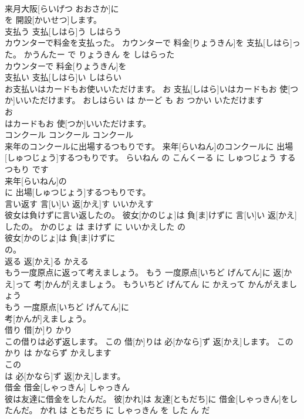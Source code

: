 \documentclass[8pt]{extreport}
\begin{document}
\begin{CJK}{UTF8}{min}
\\	来月大阪[らいげつ おおさか]に
\\	を 開設[かいせつ]します。			
\\	支払う	支払[しはら]う	しはらう	
\\	カウンターで料金を支払った。	カウンターで 料金[りょうきん]を 支払[しはら]った。	かうんたー で りょうきん を しはらった	
\\	カウンターで 料金[りょうきん]を
\\	支払い	支払[しはら]い	しはらい	
\\	お支払いはカードもお使いいただけます。	お 支払[しはら]いはカードもお 使[つか]いいただけます。	おしはらい は かーど も お つかい いただけます	
\\	お
\\	はカードもお 使[つか]いいただけます。			
\\	コンクール	コンクール	コンクール	
\\	来年のコンクールに出場するつもりです。	来年[らいねん]のコンクールに 出場[しゅつじょう]するつもりです。	らいねん の こんくーる に しゅつじょう する つもり です	
\\	来年[らいねん]の
\\	に 出場[しゅつじょう]するつもりです。			
\\	言い返す	言[い]い 返[かえ]す	いいかえす	
\\	彼女は負けずに言い返したの。	彼女[かのじょ]は 負[ま]けずに 言[い]い 返[かえ]したの。	かのじょ は まけず に いいかえした の	
\\	彼女[かのじょ]は 負[ま]けずに
\\	の。			
\\	返る	返[かえ]る	かえる	
\\	もう一度原点に返って考えましょう。	もう 一度原点[いちど げんてん]に 返[かえ]って 考[かんが]えましょう。	もういちど げんてん に かえって かんがえましょう	
\\	もう 一度原点[いちど げんてん]に
\\	考[かんが]えましょう。			
\\	借り	借[か]り	かり	
\\	この借りは必ず返します。	この 借[か]りは 必[かなら]ず 返[かえ]します。	この かり は かならず かえします	
\\	この
\\	は 必[かなら]ず 返[かえ]します。			
\\	借金	借金[しゃっきん]	しゃっきん	
\\	彼は友達に借金をしたんだ。	彼[かれ]は 友達[ともだち]に 借金[しゃっきん]をしたんだ。	かれ は ともだち に しゃっきん を した ん だ	

\end{CJK}
\end{document}
